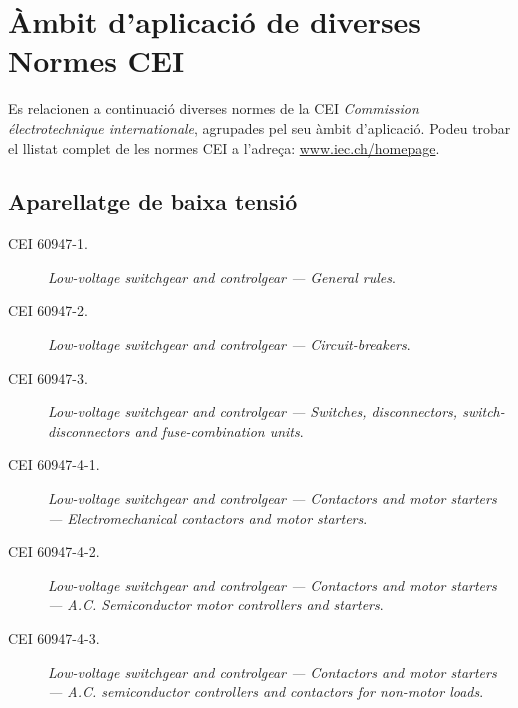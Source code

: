 \section{Àmbit d'aplicació de diverses Normes CEI}\label{sec:normes_IEC}

Es relacionen a continuació diverses normes de la CEI \textit{Commission électrotechnique internationale}, agrupades pel seu àmbit d'aplicació. Podeu trobar el llistat complet de les normes CEI a l'adreça: \href{https://www.iec.ch/homepage}{www.iec.ch/homepage}.

\subsection*{Aparellatge de baixa tensió}
\begin{description}
	\item [\hspace{5mm}CEI 60947-1.] \textit{Low-voltage switchgear and controlgear --- General rules}.
	\item [\hspace{5mm}CEI 60947-2.] \textit{Low-voltage switchgear and controlgear --- Circuit-breakers}.
	\item [\hspace{5mm}CEI 60947-3.] \textit{Low-voltage switchgear and controlgear --- Switches, disconnectors, switch-dis\-con\-nec\-tors and fuse-combination units}.
	\item [\hspace{5mm}CEI 60947-4-1.] \textit{Low-voltage switchgear and controlgear --- Contactors and motor starters --- Electromechanical contactors and motor starters}.
	\item [\hspace{5mm}CEI 60947-4-2.] \textit{Low-voltage switchgear and controlgear --- Contactors and motor starters --- A.C. Semiconductor motor controllers and starters}.
	\item [\hspace{5mm}CEI 60947-4-3.] \textit{Low-voltage switchgear and controlgear --- Contactors and motor starters --- A.C. semiconductor controllers and contactors for non-motor loads}.
\end{description}



